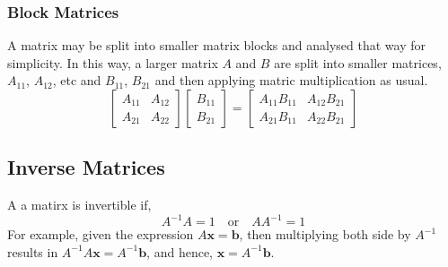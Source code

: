         \subsubsection{Block Matrices}
            A matrix may be split into smaller matrix blocks and analysed that way for simplicity. In this way, a      
            larger matrix \(A\) and \(B\) are split into smaller matrices, \(A_11\), \(A_12\), etc and \(B_11\), 
            \(B_21\) and then applying matric multiplication as usual.
            \begin{equation}
                \begin{bmatrix}
                    A_{11} & A_{12} \\
                    A_{21} & A_{22}
                \end{bmatrix}
                \begin{bmatrix}
                    B_{11} \\
                    B_{21}
                \end{bmatrix}
                =
                \begin{bmatrix}
                    A_{11} B_{11} & A_{12} B_{21} \\
                    A_{21} B_{11} & A_{22} B_{21}
                \end{bmatrix}
            \end{equation}

    \subsection{Inverse Matrices}
        A a matirx is invertible if, 
        \begin{equation}
            A^{-1} A = 1 \quad \textrm{or} \quad AA^{-1} = 1
        \end{equation}
        For example, given the expression \(A \boldsymbol{x} = \boldsymbol{b}\), then multiplying both side by 
        \(A^{-1}\) results in \(A^{-1}A\boldsymbol{x} = A^{-1}\boldsymbol{b}\), and hence, 
        \(\boldsymbol{x} = A^{-1}\boldsymbol{b}\).

